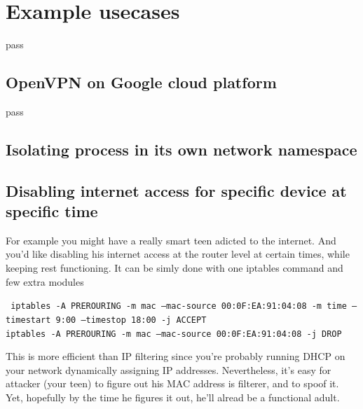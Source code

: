 \documentclass[times, utf8, seminar, english]{fer}
\begin{document}
\chapter{Example usecases}
pass
\section{OpenVPN on Google cloud platform}
pass
\section{Isolating process in its own network namespace}

\section{Disabling internet access for specific device at specific time}

For example you might have a really smart teen adicted to the internet.
And you'd like disabling his internet access at the router level at certain times, while keeping rest functioning. 
It can be simly done with one iptables command and few extra modules

\texttt{
    iptables -A PREROURING -m mac --mac-source 00:0F:EA:91:04:08 -m time --timestart 9:00 --timestop 18:00 -j ACCEPT\\
    iptables -A PREROURING -m mac --mac-source 00:0F:EA:91:04:08 -j DROP
}

This is more efficient than IP filtering since you're probably running DHCP on your network dynamically assigning IP addresses. 
Nevertheless, it's easy for attacker (your teen) to figure out his MAC address is filterer, and to spoof it. 
Yet, hopefully by the time he figures it out, he'll alread be a functional adult.



\end{document}
